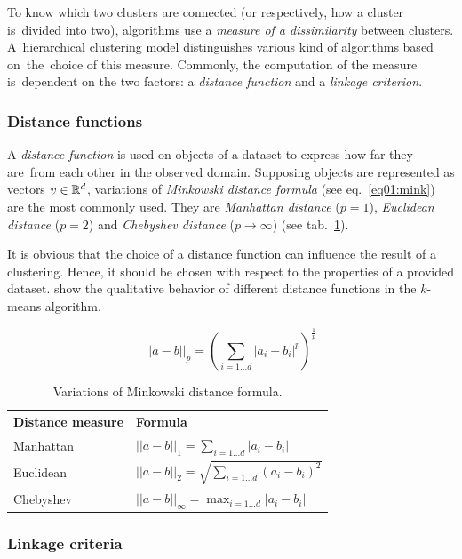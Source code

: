 To know which two clusters are connected (or respectively, how a cluster is~divided into two), algorithms use a \emph{measure of a dissimilarity} between clusters.  
A~hierarchical clustering model distinguishes various kind of algorithms based on~the~choice of this measure. Commonly, the computation of the measure is~dependent on the two factors: a \emph{distance function} and a \emph{linkage criterion}. 

\subsubsection{Distance functions}

A \emph{distance function} is used on objects of a dataset to express how far they are~from each other in the observed domain. Supposing objects are represented as vectors $v \in \mathbb{R}^d$, variations of \emph{Minkowski distance formula} (see eq.~\ref{eq01:mink}) are the most commonly used.
They are \emph{Manhattan distance} ($p=1$), \emph{Euclidean distance} ($p=2$) and \emph{Chebyshev distance} ($p \to \infty$) (see tab.~\ref{tab01:mink}).

It is obvious that the choice of a distance function can influence the result of a clustering. Hence, it should be chosen with respect to the properties of a provided dataset. \citet{aggarwal2001surprising} show the qualitative behavior of different distance functions in the $k$-means algorithm.  

\begin{equation}\label{eq01:mink}
||a-b||_p = (\sum_{i=1...d}|a_i-b_i|^p)^{\frac{1}{p}}
\end{equation}

\begin{table}
	\centering
	\begin{tabular}{ll}
		\toprule
		Distance measure & Formula \\
		\midrule
		Manhattan & $||a-b||_1 = \sum_{i=1...d}|a_i-b_i|$          \\
		Euclidean & $||a-b||_2 = \sqrt{\sum_{i=1...d}(a_i-b_i)^2}$ \\
		Chebyshev & $||a-b||_\infty = \max_{i=1\dots d}|a_i-b_i|$  \\ \bottomrule
	\end{tabular}
	\caption{Variations of Minkowski distance formula.}
	\label{tab01:mink}
\end{table}

\subsubsection{Linkage criteria}

